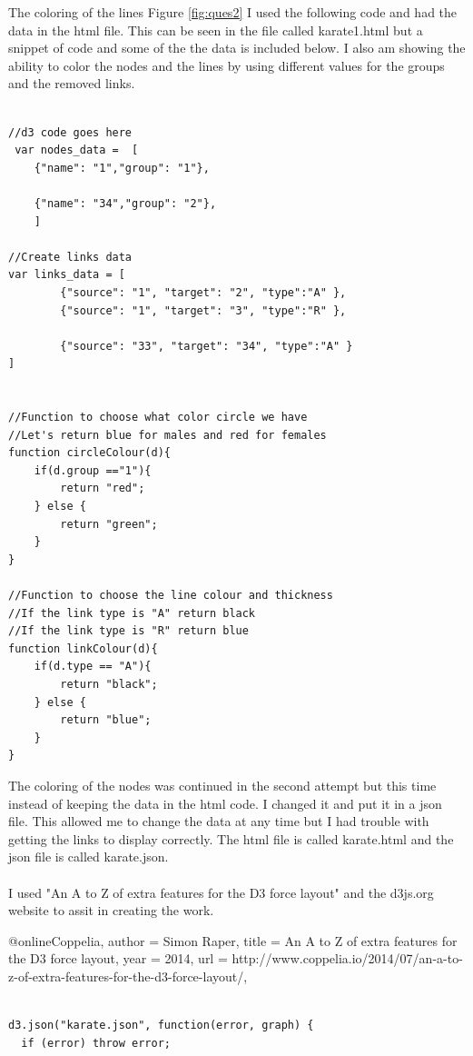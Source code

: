 \documentclass[10pt,letterpaper]{article}
\begin{document}
The coloring of the lines Figure \ref{fig:ques2} I used the following code and had the data in the html file.  This can be seen in the file called karate1.html but a snippet of code and some of the the data is included below.  I also am showing the ability to color the nodes and the lines by using different values for the groups and the removed links.

\begin{lstlisting}
 
//d3 code goes here 
 var nodes_data =  [
    {"name": "1","group": "1"},

    {"name": "34","group": "2"},
    ]

//Create links data 
var links_data = [
        {"source": "1", "target": "2", "type":"A" }, 
        {"source": "1", "target": "3", "type":"R" },
    
        {"source": "33", "target": "34", "type":"A" }
]


//Function to choose what color circle we have
//Let's return blue for males and red for females
function circleColour(d){
	if(d.group =="1"){
		return "red";
	} else {
		return "green";
	}
}

//Function to choose the line colour and thickness 
//If the link type is "A" return black 
//If the link type is "R" return blue 
function linkColour(d){
	if(d.type == "A"){
		return "black";
	} else {
		return "blue";
	}
}

\end{lstlisting}

The coloring of the nodes was continued in the second attempt but this time instead of keeping the data in the html code.  I changed it and put it in a json file.  This allowed me to change the data at any time but I had trouble with getting the links to display correctly.  The html file is called karate.html and the json file is called karate.json.\\
\\
I used "An A to Z of extra features for the D3 force layout" and the d3js.org website to assit in creating the work.

@online{Coppelia,
author = {Simon Raper},
title = {An A to Z of extra features for the D3 force layout},
year = {2014},
url = {http://www.coppelia.io/2014/07/an-a-to-z-of-extra-features-for-the-d3-force-layout/},
}

\begin{lstlisting}
 
d3.json("karate.json", function(error, graph) {
  if (error) throw error;

\end{lstlisting}
\end{document}
